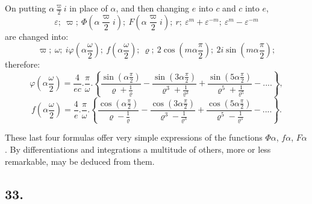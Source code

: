 \documentclass{article}
\begin{document}
On putting $\alpha\frac{\varpi}{2}i$ in place of $\alpha$, and then changing $e$ into $c$ and $c$ into $e$,
\[
\varepsilon;\ \varpi;\ \Phi\left(\alpha\frac{\varpi}{2}i\right);\ F\left(\alpha\frac{\varpi}{2}i\right);\ r;\ \varepsilon^{m}+\varepsilon^{-m};\ \varepsilon^{m}-\varepsilon^{-m}
\]
are changed into:
\[
\varpi;\ \omega;\ i\varphi\left(\alpha\frac{\omega}{2}\right);\ f\left(\alpha\frac{\omega}{2}\right);\ \varrho;\ 2\cos\left(m\alpha\frac{\pi}{2}\right);\ 2i\sin\left(m\alpha\frac{\pi}{2}\right);
\]
therefore:
\[
\varphi\left(\alpha\frac{\omega}{2}\right) = \frac{4}{ec}.\frac{\pi}{\omega}.\left\{\frac{\sin\left(\alpha\frac{\pi}{2}\right)}{\varrho+\frac{1}{\varrho}}-\frac{\sin\left(3\alpha\frac{\pi}{2}\right)}{\varrho^{3}+\frac{1}{\varrho^{3}}}+\frac{\sin\left(5\alpha\frac{\pi}{2}\right)}{\varrho^{5}+\frac{1}{\varrho^{5}}}-....\right\},
\tag{206.}
\]
\[
f\left(\alpha\frac{\omega}{2}\right) = \frac{4}{e}.\frac{\pi}{\omega}.\left\{\frac{\cos\left(\alpha\frac{\pi}{2}\right)}{\varrho-\frac{1}{\varrho}}-\frac{\cos\left(3\alpha\frac{\pi}{2}\right)}{\varrho^{3}-\frac{1}{\varrho^{3}}}+\frac{\cos\left(5\alpha\frac{\pi}{2}\right)}{\varrho^{5}-\frac{1}{\varrho^{5}}}-....\right\}.
\tag{207.}
\]

These last four formulas offer very simple expressions of the functions $\Phi\alpha$, $f\alpha$, $F\alpha$. By differentiations and integrations a multitude of others, more or less remarkable, may be deduced from them.

\subsection*{33.}
\end{document}
